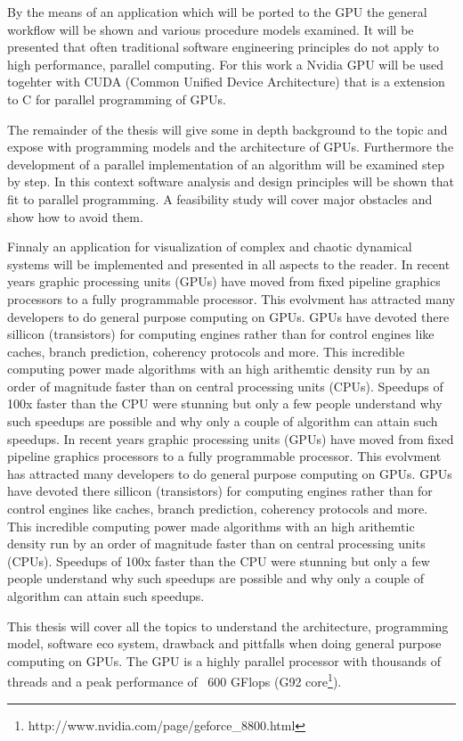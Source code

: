 By the means of an application which will be ported to the \gls{GPU} the general
workflow will be shown and various procedure models examined. It will be
presented that often traditional software engineering principles do not
apply to high performance, parallel computing. For this work a Nvidia \gls{GPU} will
be used togehter with CUDA (Common Unified Device Architecture) that is a
extension to C for parallel programming of GPUs. 

The remainder of the thesis will give some in depth background to the topic and
expose with programming models and the architecture of GPUs. Furthermore the
development of a parallel implementation of an algorithm will be examined step
by step. In this context software analysis and design principles will be shown
that fit to parallel programming. A feasibility study will cover major obstacles
and show how to avoid them.

Finnaly an application for visualization of complex and chaotic dynamical
systems will be implemented and presented in all aspects to the reader.
In recent years graphic processing units (GPUs) have moved from fixed pipeline
graphics processors to a fully programmable processor. This evolvment has
attracted many developers to do general purpose computing on GPUs. GPUs have
devoted there sillicon (transistors) for computing engines rather than for
control engines like caches, branch prediction, coherency protocols and more.
This incredible computing power made algorithms with an high arithemtic density
run by an order of magnitude faster than on central processing units (CPUs).
Speedups of 100x faster than the CPU were stunning but only a few people
understand why such speedups are possible and why only a couple of algorithm can
attain such speedups.
In recent years graphic processing units (GPUs) have moved from fixed pipeline
graphics processors to a fully programmable processor. This evolvment has
attracted many developers to do general purpose computing on GPUs. GPUs have
devoted there sillicon (transistors) for computing engines rather than for
control engines like caches, branch prediction, coherency protocols and more.
This incredible computing power made algorithms with an high arithemtic density
run by an order of magnitude faster than on central processing units (CPUs).
Speedups of 100x faster than the CPU were stunning but only a few people
understand why such speedups are possible and why only a couple of algorithm can
attain such speedups.

This thesis will cover all the topics to understand the architecture,
programming model, software eco system, drawback and pittfalls when doing
general purpose computing on GPUs. The \gls{GPU} is a highly parallel processor with
thousands of threads and a peak performance of ~600 GFlops (G92
core\footnote{http://www.nvidia.com/page/geforce\_8800.html}).

